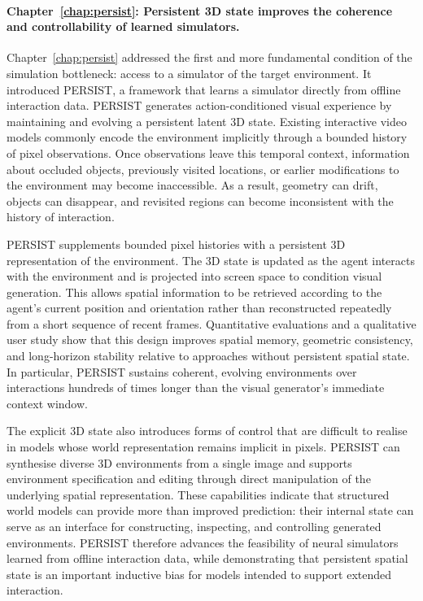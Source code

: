 \paragraph{Chapter~\ref{chap:persist}: Persistent 3D state improves the coherence and controllability of learned simulators.}
Chapter~\ref{chap:persist} addressed the first and more fundamental condition of the simulation bottleneck: access to a simulator of the target environment. It introduced \hbox{PERSIST}, a framework that learns a simulator directly from offline interaction data. PERSIST generates action-conditioned visual experience by maintaining and evolving a persistent latent 3D state. Existing interactive video models commonly encode the environment implicitly through a bounded history of pixel observations. Once observations leave this temporal context, information about occluded objects, previously visited locations, or earlier modifications to the environment may become inaccessible. As a result, geometry can drift, objects can disappear, and revisited regions can become inconsistent with the history of interaction.

PERSIST supplements bounded pixel histories with a persistent 3D representation of the environment. The 3D state is updated as the agent interacts with the environment and is projected into screen space to condition visual generation. This allows spatial information to be retrieved according to the agent's current position and orientation rather than reconstructed repeatedly from a short sequence of recent frames. Quantitative evaluations and a qualitative user study show that this design improves spatial memory, geometric consistency, and long-horizon stability relative to approaches without persistent spatial state. In particular, PERSIST sustains coherent, evolving environments over interactions hundreds of times longer than the visual generator's immediate context window.

The explicit 3D state also introduces forms of control that are difficult to realise in models whose world representation remains implicit in pixels. PERSIST can synthesise diverse 3D environments from a single image and supports environment specification and editing through direct manipulation of the underlying spatial representation. These capabilities indicate that structured world models can provide more than improved prediction: their internal state can serve as an interface for constructing, inspecting, and controlling generated environments. PERSIST therefore advances the feasibility of neural simulators learned from offline interaction data, while demonstrating that persistent spatial state is an important inductive bias for models intended to support extended interaction.

